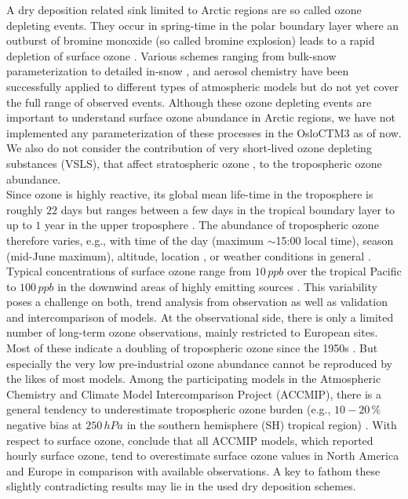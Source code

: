 \documentclass[gmd, manuscript]{copernicus}
\begin{document}
A dry deposition related sink limited to Arctic regions are so called ozone depleting events. They occur in spring-time in the polar boundary layer where an outburst of bromine monoxide  (so called bromine explosion) leads to a rapid depletion of surface ozone \citep{JGR:Oltmans1981,GRL:Bottenheim1986,Nat:Barrie1988,JGR:Bottenheim2006}. Various schemes ranging from bulk-snow parameterization \citep{ACP:Toyota2011,GMD:Falk2018} to detailed in-snow \citep{ACP:Toyota2014a}, and aerosol chemistry \citep{ACP:Yang2010} have been successfully applied to different types of atmospheric models but do not yet cover the full range of observed events. Although these ozone depleting events are important to understand surface ozone abundance in Arctic regions, we have not implemented any parameterization of these processes in the OsloCTM3 as of now. We also do not consider the contribution of very short-lived ozone depleting substances (VSLS), that affect stratospheric ozone \citep{JGR:Warwick2006, ACP:Ziska2013, ACP:Hossaini2016, ACP:Falk2017}, to the tropospheric ozone abundance.\\
Since ozone is highly reactive, its global mean life-time in the troposphere is roughly $22$ days but ranges between a few days in the tropical boundary layer to up to $1$ year in the upper troposphere \citep{JGR:Stevenson2005,ACP:Young2013}. The abundance of tropospheric ozone therefore varies, e.g., with time of the day (maximum $\sim$15:00 local time), season (mid-June maximum), altitude, location \citep{ACP:Schnell2015}, or weather conditions in general \citep{ACP:Otero2018}. Typical concentrations of surface ozone range from $10\,\unit{ppb}$ over the tropical Pacific to $100\,\unit{ppb}$ in the downwind areas of highly emitting sources \citep[Chapter 8]{IPCC2013}. This variability poses a challenge on both, trend analysis from observation as well as validation and intercomparison of models. At the observational side, there is only a limited number of long-term ozone observations, mainly restricted to European sites. Most of these indicate a doubling of tropospheric ozone since the 1950s \citep[Chapter 2]{IPCC2013}. But especially the very low pre-industrial ozone abundance cannot be reproduced by the likes of most models. Among the participating models in the Atmospheric Chemistry and Climate Model Intercomparison Project (ACCMIP), there is a general tendency to underestimate tropospheric ozone burden (e.g., $10-20\,\unit{\%}$ negative bias at $250\,\unit{hPa}$ in the southern hemisphere (SH) tropical region) \citep[Chapter 8]{IPCC2013}. With respect to surface ozone, \citet{ACP:Schnell2015} conclude that all ACCMIP models, which reported hourly surface ozone, tend to overestimate surface ozone values in North America and Europe in comparison with available observations. A key to fathom these slightly contradicting results may lie in the used dry deposition schemes.\\
\end{document}
